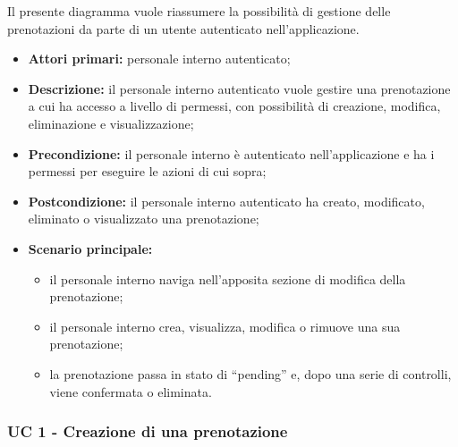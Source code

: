 Il presente diagramma vuole riassumere la possibilità di gestione delle prenotazioni da parte di un utente autenticato nell’applicazione.

\begin{itemize}
\item \textbf{Attori primari:} personale interno autenticato;
\item \textbf{Descrizione:} il personale interno autenticato vuole gestire una prenotazione a cui ha accesso a livello di permessi, con possibilità di creazione, modifica, eliminazione e visualizzazione;
\item \textbf{Precondizione:} il personale interno è autenticato nell’applicazione e ha i permessi per eseguire le azioni di cui sopra;
\item \textbf{Postcondizione:} il personale interno autenticato ha creato, modificato, eliminato o visualizzato una prenotazione;
\item \textbf{Scenario principale:} 
	\begin{itemize}
		\item il personale interno naviga nell’apposita sezione di modifica della prenotazione;
		\item il personale interno crea, visualizza, modifica o rimuove una sua prenotazione;
		\item la prenotazione passa in stato di “pending” e, dopo una serie di controlli, viene confermata o eliminata.
	\end{itemize}
\end{itemize}

\subsubsection{UC 1 - Creazione di una prenotazione}


